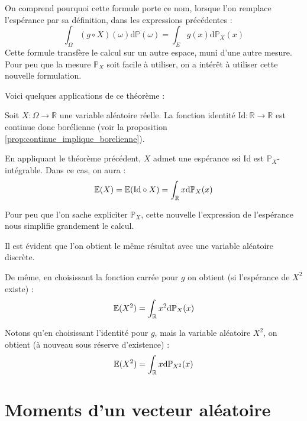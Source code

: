 \documentclass[../integ-proba.tex]{subfiles}
\begin{document}
\begin{rem}
    On comprend pourquoi cette formule porte ce nom, lorsque l'on remplace l'espérance par sa définition, dans les expressions précédentes :
    $$
    \int_\Omega (g \circ X)(\omega) \text{d} \mathbb{P}(\omega) = \int_E g(x) \text{d} \mathbb{P}_X(x)
    $$
    Cette formule transfère le calcul sur un autre espace, muni d'une autre mesure.
    Pour peu que la mesure $\mathbb{P}_X$ soit facile à utiliser, on a intérêt à utiliser cette nouvelle formulation.
\end{rem}

Voici quelques applications de ce théorème :

\begin{exemple}
    Soit $X:\Omega \longrightarrow \mathbb{R}$ une variable aléatoire réelle.
    La fonction identité $\text{Id}:\mathbb{R} \longrightarrow \mathbb{R}$ est continue donc borélienne (voir la proposition \ref{prop:continue_implique_borelienne}).

    En appliquant le théorème précédent, $X$ admet une espérance ssi $\text{Id}$ est $\mathbb{P}_X$-intégrable.
    Dans ce cas, on aura :
    $$
    \mathbb{E}(X) = \mathbb{E}(\text{Id} \circ X) = \int_\mathbb{R} x\textnormal{d}\mathbb{P}_X(x)
    $$

    Pour peu que l'on sache expliciter $\mathbb{P}_X$, cette nouvelle l'expression de l'espérance nous simplifie grandement le calcul.

    Il est évident que l'on obtient le même résultat avec une variable aléatoire discrète.
\end{exemple}

\begin{exemple}
    De même, en choisissant la fonction carrée pour $g$ on obtient (si l'espérance de $X^2$ existe) :
    $$
    \mathbb{E}(X^2) = \int_\mathbb{R} x^2\textnormal{d}\mathbb{P}_X(x)
    $$

    Notons qu'en choisissant l'identité pour $g$, mais la variable aléatoire $X^2$, on obtient (à nouveau sous réserve d'existence) :
    $$
    \mathbb{E}(X^2) = \int_\mathbb{R} x\textnormal{d}\mathbb{P}_{X^2}(x)
    $$
\end{exemple}

\section{Moments d'un vecteur aléatoire}
\end{document}

